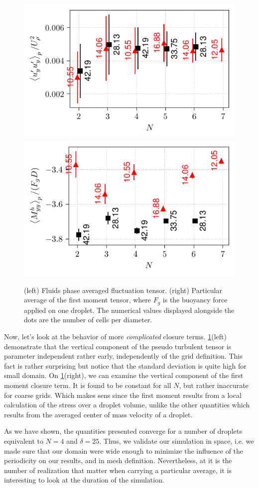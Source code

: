 \begin{figure}[h!]
    \centering
    \includegraphics[height= 0.3\textwidth]{image/VALIDATION/N_and_delta/PA_UpUp.pdf}
    \includegraphics[height= 0.3\textwidth]{image/VALIDATION/N_and_delta/Mh.pdf}
    \caption{(left) Fluids phase averaged fluctuation tensor.
            (right) Particular average of the first moment tensor, where $F_g$ is the buoyancy force applied on one droplet. 
            The numerical values displayed alongside the dots are the number of cells per diameter.}
    \label{fig:VALIDATION_Nd_2}
\end{figure}
Now, let's look at the behavior of more \textit{complicated} closure terms. 
\ref{fig:VALIDATION_Nd_2}(left) demonstrate that the vertical component of the pseudo turbulent tensor is parameter independent rather early, independently of the grid definition. 
This fact is rather surprising but notice that the standard deviation is quite high for small domain. 
On \ref{fig:VALIDATION_Nd_2}(right), we can examine the vertical component of the first moment closure term. 
It is found to be constant for all $N$, but rather inaccurate for coarse grids. 
Which makes sens since the first moment results from a local calculation of the stress over a droplet volume, unlike the other quantities which results from the averaged center of mass velocity of a droplet. 

As we have shown, the quantities presented converge for a number of droplets equivalent to $N = 4$ and $\delta = 25$. 
Thus, we validate our simulation in space, i.e. we made sure that our domain were wide enough to minimize the influence of the periodicity on our results, and in mesh definition. 
Nevertheless, at it is the number of realization that matter when carrying a particular average, it is interesting to look at the duration of the simulation.

